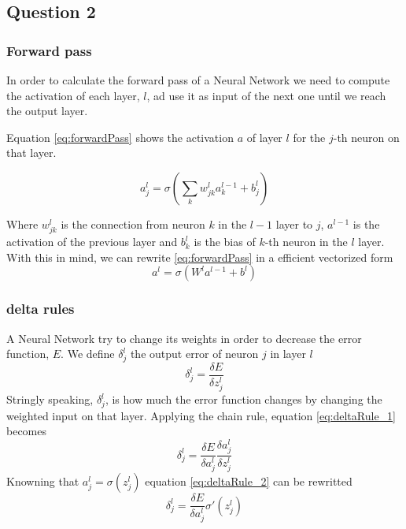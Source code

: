 \documentclass[11pt]{article}
\begin{document}
\subsection{Question 2}
\subsubsection{Forward pass}
In order to calculate the forward pass of a Neural Network we need to compute the activation of each layer, $l$, ad use it as input of the next one until we reach the output layer. 

Equation \ref{eq:forwardPass} shows the activation $a$ of layer $l$ for the $j$-th neuron on that layer.

\begin{equation}
\label{eq:forwardPass}
a^l_j = \sigma(\sum_k w^l_{jk}a^{l-1}_k + b^l_j)
\end{equation}

Where $w^l_{jk}$ is the connection from neuron $k$ in the $l-1$ layer to $j$, $a^{l-1}$ is the activation of the previous layer and $b^l_k$ is the bias of $k$-th neuron in the $l$ layer. With this in mind, we can rewrite \ref{eq:forwardPass} in a efficient vectorized form
\begin{equation}
\label{eq:forwardPassVectorized}
a^l = \sigma(W^la^{l-1} + b^l)
\end{equation}

\subsubsection{delta rules}
A Neural Network try to change its weights in order to decrease the error function, $E$. We define $\delta^l_j$ the output error of neuron $j$ in layer $l$
\begin{equation}
	\label{eq:deltaRule_1}
	\delta^l_j = \frac{\delta E}{\delta z^l_j}
\end{equation}
Stringly speaking, $\delta^l_j$, is how much the error function changes by changing the weighted input on that layer. Applying the chain rule, equation \ref{eq:deltaRule_1} becomes
\begin{equation}
\label{eq:deltaRule_2}
\delta^l_j = \frac{\delta E}{\delta a^l_j} \frac{\delta a^l_j}{\delta z^l_j}
\end{equation}
Knowning that $a^l_j = \sigma(z^l_j)$ equation \ref{eq:deltaRule_2} can be rewritted
\begin{equation}
\label{eq:deltaRule}	
\delta^l_j = \frac{\delta E}{\delta a^l_j} \sigma'(z^l_j)
\end{equation}  
\end{document}
